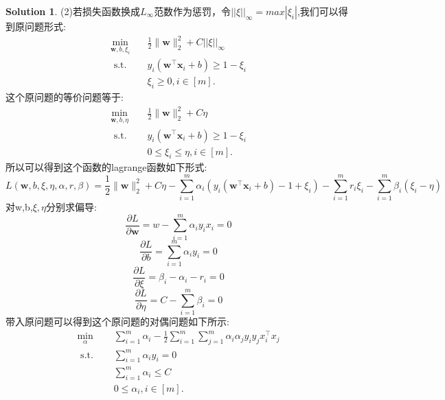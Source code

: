 \documentclass[a4paper,UTF8]{article}
\numberwithin{equation}{section}
\theoremstyle{definition}
\newtheorem*{solution}{Solution}
\newcommand{\vct}[1]{\boldsymbol{#1}} %
\newcommand{\vw}{\vct{w}}
\newcommand{\vx}{\vct{x}}
\begin{document}
\begin{solution}
(2)若损失函数换成$L_{\infty}$范数作为惩罚，令$||\xi||_{\infty} = max|\xi_i|$,我们可以得到原问题形式:\\
\begin{equation}
    \begin{aligned}
        \min _{\vw, b, \xi_{i}} \quad & \frac{1}{2}\|\vw\|_{2}^{2}+C ||\xi||_{\infty}\\
        \text { s.t. } \quad & y_{i}\left(\vw^{\top} \vx_{i}+b\right) \geq 1- \xi_{i} \\
        & \xi_{i} \geq 0, i \in [m] .
    \end{aligned}
\end{equation}
这个原问题的等价问题等于:\\
\begin{equation}
    \begin{aligned}
        \min _{\vw, b, \eta} \quad & \frac{1}{2}\|\vw\|_{2}^{2}+C \eta\\
        \text { s.t. } \quad & y_{i}\left(\vw^{\top} \vx_{i}+b\right) \geq 1- \xi_{i} \\
        & 0 \leq \xi_i \leq \eta, i \in [m] .
    \end{aligned}
\end{equation}
所以可以得到这个函数的lagrange函数如下形式:\\
\[  L(\vw, b, \xi, \eta, \alpha, r, \beta) = \frac{1}{2}\|\vw\|_{2}^{2} + C \eta - \sum_{i=1}^{m} \alpha_i( y_{i}(\vw^{\top} \vx_{i}+b) - 1 + \xi_{i}) -\sum_{i=1}^{m}r_i \xi_i - \sum_{i=1}^{m} \beta_i (\xi_{i} - \eta)    \]
对w,b,$\xi, \eta$分别求偏导:\\
\[  \frac{\partial L}{\partial \vw} = w  - \sum_{i=1}^{m}\alpha_i y_i x_i = 0\]
\[  \frac{\partial L}{\partial b} =  \sum_{i=1}^{m}\alpha_i y_i  = 0\]
\[  \frac{\partial L}{\partial \xi} = \beta_i - \alpha_i - r_i = 0\]
\[  \frac{\partial L}{\partial \eta} = C  - \sum_{i=1}^{m}\beta_i = 0\]
带入原问题可以得到这个原问题的对偶问题如下所示:\\
\begin{equation}
    \begin{aligned}
        \min _{\alpha} \quad & \sum_{i=1}^{m}\alpha_i - \frac{1}{2}\sum_{i=1}^{m}\sum_{j=1}^{m}\alpha_i \alpha_j y_i y_j x_i^{\top} x_j  \\
        \text { s.t. } \quad &  \sum_{i=1}^{m}\alpha_i y_i  = 0\\\
        & \sum_{i=1}^{m}\alpha_i \leq C \\
        & 0 \leq \alpha_i, i \in [m] .
    \end{aligned}
\end{equation}


\end{solution}
\end{document}
